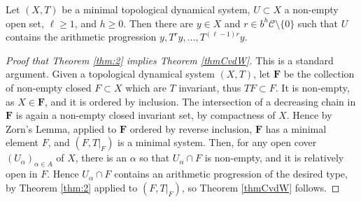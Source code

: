  
\begin{theorem}\label{thm:2}
    Let $(X,T)$ be a minimal topological dynamical system, $U\subset X$ a non-empty open set, $\ell \geq 1$, and $h \geq 0$. 
    Then there are $y\in X$ and $r\in b ^{h}\mathcal C\setminus \{0\}$ such that $U$ contains the arithmetic progression $y, T^{r}y, \ldots, T^{(\ell-1)r}y$.
\end{theorem}


\begin{proof}[Proof that Theorem \ref{thm:2} implies Theorem \ref{thmCvdW}]
This is a standard argument.   
Given a  topological dynamical system $(X,T)$, let $\mathbf F$ 
be the collection of non-empty closed $F\subset X$ which are $T$ invariant, thus $TF\subset F$.  
It is non-empty, as $X \in \mathbf F$, and it is ordered by inclusion.  
The intersection of a decreasing chain in $\mathbf F$ is again a non-empty closed invariant set, by compactness of $X$.  
Hence by Zorn's Lemma, applied to $\mathbf F$ ordered by reverse inclusion, $\mathbf F$ has a minimal element $F$, and $(F, T\vert _F)$ is a minimal system. 
Then, for any open cover $(U_\alpha)_{\alpha\in A}$ of $X$,  there is an $\alpha$ so that  $U_\alpha \cap F$ is non-empty, and it is relatively open in $F$. 
Hence 
$U_\alpha \cap F$ contains an  arithmetic progression of the desired type, by Theorem \ref{thm:2} applied to $(F,T\vert_F)$, so 
Theorem \ref{thmCvdW} follows. 
\end{proof}

